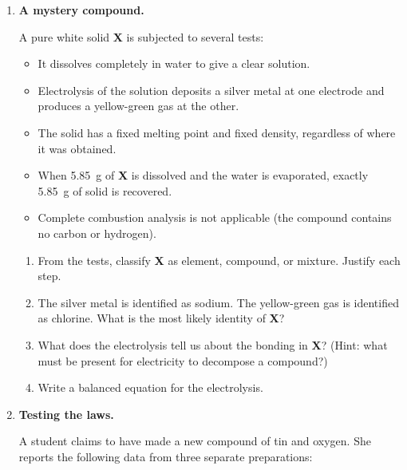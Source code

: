 \documentclass[12pt, a4paper]{book}
\theoremstyle{definition}
\begin{document}
\begin{problembox}[title={Integration Problems}]
\begin{enumerate}[label=\textbf{I\arabic*.}]
  \item \textbf{A mystery compound.}

        A pure white solid \textbf{X} is subjected to several tests:
        \begin{itemize}[nosep, leftmargin=2em]
          \item It dissolves completely in water to give a clear solution.
          \item Electrolysis of the solution deposits a silver metal
                at one electrode and produces a yellow-green gas at the other.
          \item The solid has a fixed melting point and fixed density,
                regardless of where it was obtained.
          \item When \SI{5.85}{\gram} of \textbf{X} is dissolved and
                the water is evaporated, exactly \SI{5.85}{\gram}
                of solid is recovered.
          \item Complete combustion analysis is not applicable
                (the compound contains no carbon or hydrogen).
        \end{itemize}

        \begin{enumerate}[label=(\alph*)]
          \item From the tests, classify \textbf{X} as element,
                compound, or mixture. Justify each step.
          \item The silver metal is identified as sodium.
                The yellow-green gas is identified as chlorine.
                What is the most likely identity of \textbf{X}?
          \item What does the electrolysis tell us about the
                bonding in \textbf{X}?
                (Hint: what must be present for electricity to
                decompose a compound?)
          \item Write a balanced equation for the electrolysis.
        \end{enumerate}

  \item \textbf{Testing the laws.}

        A student claims to have made a new compound of tin and oxygen.
        She reports the following data from three separate preparations:


\end{enumerate}
\end{problembox}
\end{document}
